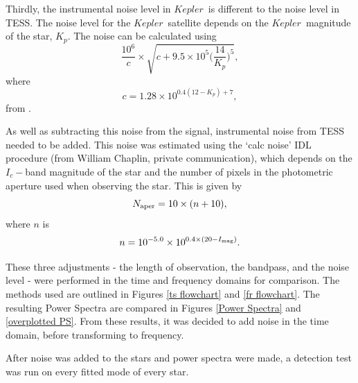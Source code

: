 \documentclass[a4paper,fleqn,usenatbib,useAMS]{mnras}
\newcommand{\kep}{\ensuremath{Kepler}}
\begin{document}
Thirdly, the instrumental noise level in \kep \ is different to the noise level in TESS. The noise level for the \kep \ satellite depends on the \kep \ magnitude of the star, $K_{p}$. The noise can be calculated using
\begin{equation}
\frac{10^{6}}{c} \times \sqrt{c+9.5 \times 10^{5}\Bigg(\frac{14}{K_{p}}\Bigg)^{5}} ,
\end{equation}
where
\begin{equation}
c = 1.28 \times 10^{0.4(12-K_{p})+7} ,
\end{equation}
from \citet{chaplin_predicting_2011}.

As well as subtracting this noise from the signal, instrumental noise from TESS needed to be added. This noise was estimated using the `calc noise' IDL procedure (from William Chaplin, private communication), which depends on the $I_{c}-$band magnitude of the star and the number of pixels in the photometric aperture used when observing the star. This is given by
\begin{equation}
N_{\rm aper} = 10 \times (n+10) , 
\end{equation}
where $n$ is
\begin{equation}
n = 10^{-5.0} \times 10^{ 0.4 \times (20-I_{\rm mag})} .
\end{equation}

These three adjustments - the length of observation, the bandpass, and the noise level - were performed in the time and frequency domains for comparison. The methods used are outlined in Figures \ref{ts flowchart} and \ref{fr flowchart}. The resulting Power Spectra are compared in Figures \ref{Power Spectra} and \ref{overplotted PS}. From these results, it was decided to add noise in the time domain, before transforming to frequency. 

After noise was added to the stars and power spectra were made, a detection test was run on every fitted mode of every star. 
\end{document}

